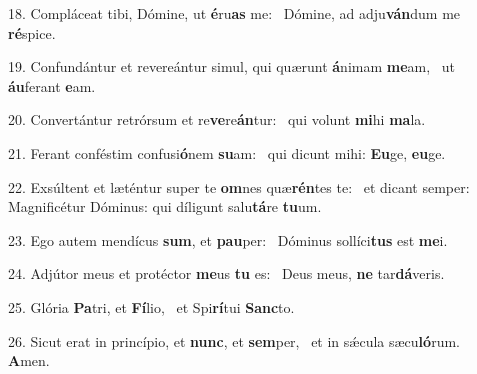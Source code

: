 18. Compláceat tibi, Dómine, ut \textbf{é}ru\textbf{as} me: \ast\  Dómine, ad adju\textbf{ván}dum me \textbf{ré}spice.\

19. Confundántur et revereántur simul, qui quærunt \textbf{á}nimam \textbf{me}am, \ast\  ut \textbf{áu}ferant \textbf{e}am.\

20. Convertántur retrórsum et re\textbf{ve}re\textbf{án}tur: \ast\  qui volunt \textbf{mi}hi \textbf{ma}la.\

21. Ferant conféstim confusi\textbf{ó}nem \textbf{su}am: \ast\  qui dicunt mihi: \textbf{Eu}ge, \textbf{eu}ge.\

22. Exsúltent et læténtur super te \textbf{om}nes quæ\textbf{rén}tes te: \ast\  et dicant semper: Magnificétur Dóminus: qui díligunt salu\textbf{tá}re \textbf{tu}um.\

23. Ego autem mendícus \textbf{sum}, et \textbf{pau}per: \ast\  Dóminus sollíci\textbf{tus} est \textbf{me}i.\

24. Adjútor meus et protéctor \textbf{me}us \textbf{tu} es: \ast\  Deus meus, \textbf{ne} tar\textbf{dá}veris.\

25. Glória \textbf{Pa}tri, et \textbf{Fí}lio, \ast\  et Spi\textbf{rí}tui \textbf{Sanc}to.\

26. Sicut erat in princípio, et \textbf{nunc}, et \textbf{sem}per, \ast\  et in sǽcula sæcu\textbf{ló}rum. \textbf{A}men.\


